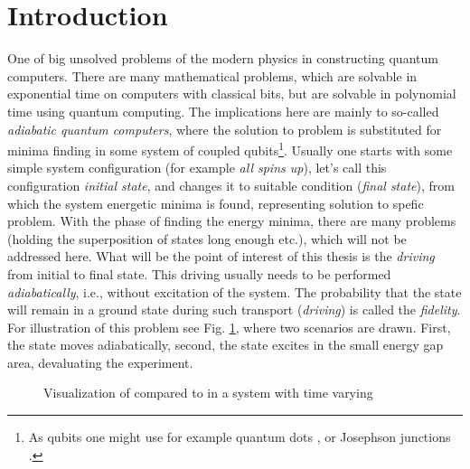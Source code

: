 \chapter*{Introduction}
One of big unsolved problems of the modern physics in constructing quantum computers. There are many mathematical problems, which are solvable in exponential time on computers with classical bits, but are solvable in polynomial time using quantum computing. The implications here are mainly to so-called \emph{adiabatic quantum computers}, where the solution to problem is substituted for minima finding in some system of coupled qubits\footnote{As qubits one might use for example quantum dots \citep{dots}, or Josephson junctions \citep{josephson}.}. Usually one starts with some simple system configuration (for example \emph{all spins up}), let's call this configuration \emph{initial state}, and changes it to suitable condition (\emph{final state}), from which the system energetic minima is found, representing solution to spefic problem. With the phase of finding the energy minima, there are many problems (holding the superposition of states long enough etc.), which will not be addressed here. What will be the point of interest of this thesis is the \emph{driving} from initial to final state. This driving usually needs to be performed \emph{adiabatically}, i.e., without excitation of the system. The probability that the state will remain in a ground state during such transport (\emph{driving}) is called the \emph{fidelity}. For illustration of this problem see Fig. \ref{fig:introDriving}, where two scenarios are drawn. First, the state moves adiabatically, second, the state excites in the small energy gap area, devaluating the experiment.


\begin{figure}[H]
    \centering
\caption{Visualization of  compared to  in a system with time varying }
    \label{fig:introDriving}
\end{figure}



